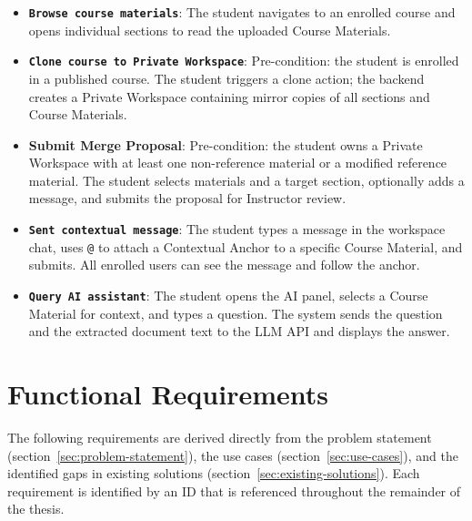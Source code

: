 \begin{itemize}
    \item \textbf{\texttt{Browse course materials}}: The student navigates to an enrolled course
          and opens individual sections to read the uploaded Course Materials.
    \item \textbf{\texttt{Clone course to Private Workspace}}: Pre-condition: the student is
          enrolled in a published course. The student triggers a clone action; the backend creates
          a Private Workspace containing mirror copies of all sections and Course Materials.
    \item \textbf{Submit Merge Proposal}: Pre-condition: the student owns a Private
          Workspace with at least one non-reference material or a modified reference material.
          The student selects materials and a target section, optionally adds a message, and
          submits the proposal for Instructor review.
    \item \textbf{\texttt{Sent contextual message}}: The student types a message in the workspace
          chat, uses \texttt{@} to attach a Contextual Anchor to a specific Course Material, and
          submits. All enrolled users can see the message and follow the anchor.
    \item \textbf{\texttt{Query AI assistant}}: The student opens the AI panel, selects a Course
          Material for context, and types a question. The system sends the question and the
          extracted document text to the LLM API and displays the answer.
\end{itemize}

\section{Functional Requirements}
\label{sec:requirements}

The following requirements are derived directly from the problem statement (section~\ref{sec:problem-statement}),
the use cases (section~\ref{sec:use-cases}), and the identified gaps in existing solutions (section~\ref{sec:existing-solutions}). Each requirement is identified by an ID that
is referenced throughout the remainder of the thesis.

